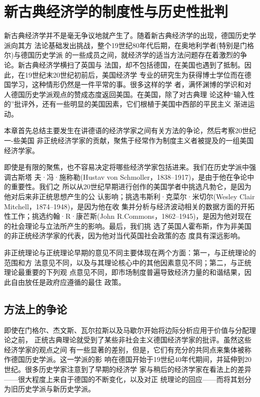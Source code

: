 \chapter{新古典经济学的制度性与历史性批判}

新古典经济学并不是毫无争议地就产生了。随着新古典经济学的出现，德国历史学派向其方
法论基础发出挑战，整个19世纪80年代后期，在奥地利学者(特别是门格尔)与德国历史学派
的一些成员之间，就经济学的适当方法问题存在着激烈的争论。新古典经济学横扫了英国与
法国，却不包括德国，在美国也遇到了抵制。因此，在19世纪末20世纪初前后，美国经济学
专业的研究生为获得博士学位而在德国学习，这种情形仍然是一件平常的事。很多这样的学
者，满怀渊博的学识和对人德国历史学派观点的赞成态度返回美国。在美国，除了对古典理
论这种“输入性的”批评外，还有一些明显的美国因素，它们根植于美国中西部的平民主义
渐进运动。

本章首先总结主要发生在讲德语的经济学家之间有关方法的争论，然后考察20世纪一-些美国
非正统经济学家的贡献，聚焦于经常作为制度主义者被提及的一组美国经济学家。

即使是有限的聚焦，也不容易决定将哪些经济学家包括进来。我们在历史学派中强调古斯塔
夫·冯·施称勒(Hustav von Schmoller，1838--1917)，是由于他在争论中的重要性。我们之
所以从20世纪早期进行创作的美国学者中挑选凡勃仑，是因为他对后来非正统思想产生的公
认影响；挑选韦斯利·克菜尔·米切尔(Wesley Clair Mitchell，1874--1948)，是因为他在收
集并分析与经济波动相关的数据方面的开拓性工作；挑选约翰·R·康芒斯(John
R.Commons，1862--1945)，是因为他对现在的社会理论与立法所产生的影响。最后，我们挑
选了英国人霍布斯，作为非美国的非正统经济学家的代表，因为他对当代英国社会政策的态
度具有深远影响。

非正统理论与正统理论早期的意见不同主要体现在两个方面：第一，与正统理论的范围和方
法意见不同，以及与其理论核心中的其他因素意见不同；第二，与正统理论最重要的下列观
点意见不同，即市场制度普遍导致经济力量的和谐结果，因此自由放任是政府应遵循的最住
政策。

\section{方法上的争论}

即使在门格尔、杰文斯、瓦尔拉斯以及马歇尔开始将边际分析应用于价值与分配理论之前，
正统古典理论就受到了某些非社会主义德国经济学家的批评。虽然这些经济学家的观点之间
有一些显著的差别，但是，它们有充分的共同点来集体被称作德国历史学派。这一学派的影
响在德国开始于19世纪40年代期间，并延伸到20世纪。很多历史学家注意到了早期的经济学
家与稍后的经济学家在看法上的差异——很大程度上来自于德国的不断变化，以及对正
统理论的回应——而将其划分为旧历史学派与新历史学派。

